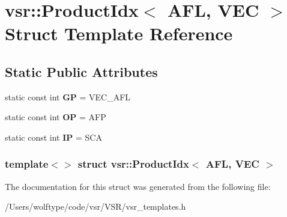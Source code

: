 \hypertarget{structvsr_1_1_product_idx_3_01_a_f_l_00_01_v_e_c_01_4}{\section{vsr\-:\-:Product\-Idx$<$ A\-F\-L, V\-E\-C $>$ Struct Template Reference}
\label{structvsr_1_1_product_idx_3_01_a_f_l_00_01_v_e_c_01_4}
}
\subsection*{Static Public Attributes}
\begin{DoxyCompactItemize}
\item 
\hypertarget{structvsr_1_1_product_idx_3_01_a_f_l_00_01_v_e_c_01_4_afecff288d7232c21d5e5cef494020c79}{static const int {\bfseries G\-P} = V\-E\-C\-\_\-\-A\-F\-L}\label{structvsr_1_1_product_idx_3_01_a_f_l_00_01_v_e_c_01_4_afecff288d7232c21d5e5cef494020c79}

\item 
\hypertarget{structvsr_1_1_product_idx_3_01_a_f_l_00_01_v_e_c_01_4_a557ef6b5592fbd276c1668150e06afc6}{static const int {\bfseries O\-P} = A\-F\-P}\label{structvsr_1_1_product_idx_3_01_a_f_l_00_01_v_e_c_01_4_a557ef6b5592fbd276c1668150e06afc6}

\item 
\hypertarget{structvsr_1_1_product_idx_3_01_a_f_l_00_01_v_e_c_01_4_ab2e9c13c462eb983aaff70af7cfb5530}{static const int {\bfseries I\-P} = S\-C\-A}\label{structvsr_1_1_product_idx_3_01_a_f_l_00_01_v_e_c_01_4_ab2e9c13c462eb983aaff70af7cfb5530}

\end{DoxyCompactItemize}
\subsubsection*{template$<$$>$ struct vsr\-::\-Product\-Idx$<$ A\-F\-L, V\-E\-C $>$}



The documentation for this struct was generated from the following file\-:\begin{DoxyCompactItemize}
\item 
/\-Users/wolftype/code/vsr/\-V\-S\-R/vsr\-\_\-templates.\-h\end{DoxyCompactItemize}

